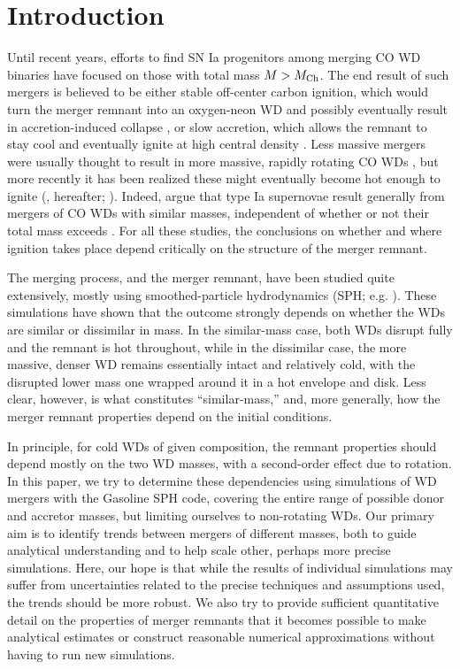 \section{Introduction}
\label{sec:c2_intro}

Until recent years, efforts to find SN Ia progenitors among merging CO WD binaries have focused on those with total mass $M>\Mch$.  The end result of such mergers is believed to be either stable off-center carbon ignition, which would turn the merger remnant into an oxygen-neon WD and possibly eventually result in accretion-induced collapse \citep{saion98}, or slow accretion, which allows the remnant to stay cool and eventually ignite at high central density \citep{yoonpr07}.  Less massive mergers were usually thought to result in more massive, rapidly rotating CO WDs \citep{segrcm97,kube+10}, but more recently it has been realized these might eventually become hot enough to ignite (\citealt{vkercj10}, \citeal{vkercj10} hereafter; \citealt{shen+12,schw+12}).  Indeed, \citeal{vkercj10} argue that type Ia supernovae result generally from mergers of CO WDs with similar masses, independent of whether or not their total mass exceeds \Mch.  For all these studies, the conclusions on whether and where ignition takes place depend critically on the structure of the merger remnant.

The merging process, and the merger remnant, have been studied quite extensively, mostly using smoothed-particle hydrodynamics (SPH; e.g. \citealt{mona05}).  These simulations have shown that the outcome strongly depends on whether the WDs are similar or dissimilar in mass.  In the similar-mass case, both WDs disrupt fully and the remnant is hot throughout, while in the dissimilar case, the more massive, denser WD remains essentially intact and relatively cold, with the disrupted lower mass one wrapped around it in a hot envelope and disk.  Less clear, however, is what constitutes ``similar-mass,'' and, more generally, how the merger remnant properties depend on the initial conditions.  

In principle, for cold WDs of given composition, the remnant properties should depend mostly on the two WD masses, with a second-order effect due to rotation.  In this paper, we try to determine these dependencies using simulations of WD mergers with the Gasoline SPH code, covering the entire range of possible donor and accretor masses, but limiting ourselves to non-rotating WDs.  Our primary aim is to identify trends between mergers of different masses, both to guide analytical understanding and to help scale other, perhaps more precise simulations.  Here, our hope is that while the results of individual simulations may suffer from uncertainties related to the precise techniques and assumptions used, the trends should be more robust.  We also try to provide sufficient quantitative detail on the properties of merger remnants that it becomes possible to make analytical estimates or construct reasonable numerical approximations without having to run new simulations.

